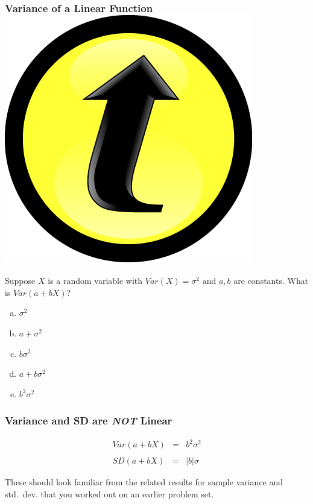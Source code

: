 \documentclass[handout]{beamer}
\begin{document}
\begin{frame}
\frametitle{Variance of a Linear Function  \hfill \includegraphics[scale = 0.05]{./images/clicker} }
Suppose $X$ is a random variable with $Var(X) = \sigma^2$ and $a,b$ are constants. What is $Var(a + bX)$? 
\begin{enumerate}[(a)]
	\item $\sigma^2$
	\item $a + \sigma^2$
	\item $b \sigma^2$
	\item $a + b \sigma^2$
	\item $b^2 \sigma^2$
\end{enumerate}

\end{frame}
\begin{frame}
	\frametitle{Variance and SD are \emph{NOT} Linear}

\begin{eqnarray*}
Var(a + bX) &= &b^2 \sigma^2 \\\\
	SD(a + bX)&=& |b| \sigma
\end{eqnarray*}

\vspace{2em}
\begin{block}{These should look familiar from the related results for sample variance and std.\ dev. that you worked out on an earlier problem set.}

\end{block}

\end{frame}
\end{document}
